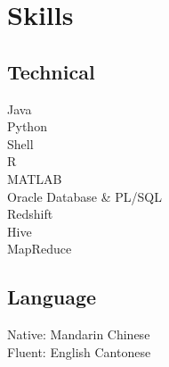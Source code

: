 \documentclass[]{deedy-resume-openfont}
\begin{document}
\begin{minipage}[t]{0.35\textwidth}

\section{Skills}
\subsection{Technical}
Java \\
Python \\
Shell \\
R \\
MATLAB \\

Oracle Database \& PL/SQL \\
Redshift \\
Hive \\
MapReduce
\sectionsep

\subsection{Language}
Native: Mandarin Chinese \\
Fluent: English \textbullet{} Cantonese


%
%

\end{minipage} 
\hfill
\end{document}
